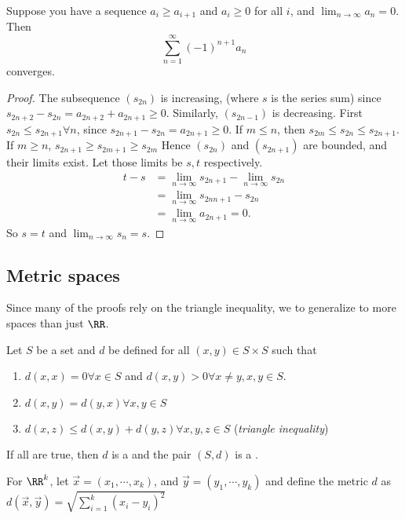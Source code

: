 \documentclass[11pt]{scrartcl}
\numberwithin{equation}{section}
\begin{document}
\begin{theorem}
    \label{thm:alterseries}
    Suppose you have a sequence $a_i\geq a_{i+1}$ and $a_i\geq 0$ for all $i$,
    and $\lim_{n\rightarrow \infty}{a_n} = 0$. Then 
    \[ \sum_{n=1}^{\infty}(-1)^{n+1}a_n\]
    converges.
\end{theorem}
\begin{proof}
    The subsequence $(s_{2n})$ is increasing, 
    (where $s$ is the series sum) since 
    $s_{2n+2} - s_{2n} = a_{2n+2} + a_{2n+1} \geq 0$.
    Similarly, $(s_{2n-1})$ is decreasing.
    First $s_{2n} \leq s_{2n+1}\forall n$, since $s_{2n+1}-s_{2n}=a_{2n+1} \geq 0$.
    If $m\leq n$, then $s_{2m}\leq s_{2n}\leq s_{2n+1}$. If $m\geq n$,
    $s_{2n+1}\geq s_{2m+1}\geq s_{2m}$
    Hence $(s_{2n})$ and $(s_{2n+1})$ are bounded, and their limits exist.
    Let those limits be $s,t$ respectively.
    \begin{align*}
        t-s &= \lim_{n\rightarrow \infty}{s_{2n+1}} -
        \lim_{n\rightarrow \infty}{s_{2n}} \\ 
        &= \lim_{n\rightarrow \infty}{s_{2nn+1} - s_{2n}} \\
        &= \lim_{n\rightarrow \infty}{a_{2n+1}} = 0.
    \end{align*}
    So $s=t$ and $\lim_{n\rightarrow \infty}{s_n} = s$.
\end{proof}
\subsection{Metric spaces}
Since many of the proofs rely on the triangle inequality, we 
to generalize to more spaces than just $\RR$.

\begin{definition}
    Let $S$ be a set and $d$ be defined for all $(x,y) \in S\times S$
    such that 
    \begin{enumerate}
        \item $d(x,x) = 0 \forall x \in S$ and $d(x,y) > 0 \forall x \neq y,x,y\in S$.
        \item $d(x,y) = d(y,x) \forall x,y\in S$
        \item $d(x,z) \leq d(x,y) + d(y,z) \forall x,y,z\in S$ (\textit{triangle inequality})
    \end{enumerate}
    If all are true, then $d$ is a 
    and the pair $(S,d)$ is a .
\end{definition}

\begin{example}
    For $\RR^k$, let $\vec{x} = (x_1,\cdots, x_k)$, and 
    $\vec{y} = (y_1,\cdots, y_k)$ and define the metric $d$ as 
    $d(\vec{x},\vec{y}) = \sqrt{\sum_{i=1}^{k}(x_i-y_i)^2}$
\end{example}
\end{document}
